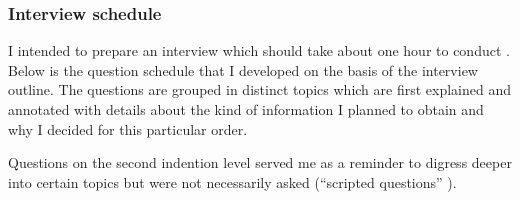 \subsubsection{Interview schedule}

I intended to prepare an interview which should take about one hour to conduct \cite[p. 82-83]{berg01}. Below is the question schedule that I developed on the basis of the interview outline. The questions are grouped in distinct topics which are first explained and annotated with details about the kind of information I planned to obtain and why I decided for this particular order.

Questions on the second indention level served me as a reminder to digress deeper into certain topics but were not necessarily asked (\enquote{scripted questions} \cite[p. 92]{berg01}).

